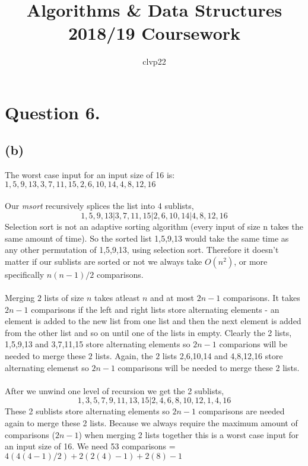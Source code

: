 \documentclass[]{article}
\title{Algorithms \& Data Structures 2018/19 Coursework}
\author{clvp22}
\begin{document}
\maketitle

\section*{Question 6.}
\subsection*{(b)}
The worst case input for an input size of 16 is: $1, 5, 9, 13, 3, 7, 11, 15, 2, 6, 10, 14, 4, 8, 12, 16$
\\
\\
Our \textit{msort} recursively splices the list into 4 sublists,
$$1, 5, 9, 13 | 3, 7, 11, 15 | 2, 6, 10, 14 | 4, 8, 12, 16$$
Selection sort is not an adaptive sorting algorithm (every input of size n takes the same amount of time).
So the sorted list 1,5,9,13 would take the same time as any other permutation of 1,5,9,13, using selection sort. Therefore it doesn't matter if our sublists are sorted or not we always take $O(n^2)$, or more specifically $n(n-1)/2$ comparisons.
\\
\\
Merging $2$ lists of size $n$ takes atleast $n$ and at most $2n-1$ comparisons. It takes $2n-1$ comparisons if the left and right lists store alternating elements - an element is added to the new list from one list and then the next element is added from the other list and so on until one of the lists in empty. Clearly the 2 lists, 1,5,9,13 and 3,7,11,15 store alternating elements so $2n-1$ comparions will be needed to merge these $2$ lists. Again, the $2$ lists 2,6,10,14 and 4,8,12,16 store alternating elemenst so $2n-1$ comparisons will be needed to merge these 2 lists.
\\
\\
After we unwind one level of recursion we get the 2 sublists,
$$1, 3, 5, 7, 9, 11, 13, 15 | 2, 4, 6, 8, 10, 12, 1, 4, 16$$
These 2 sublists store alternating elements so $2n-1$ comparisons are needed again to merge these 2 lists. Because we always require the maximum amount of comparisons ($2n-1$) when merging 2 lists together this is a worst case input for an input size of 16. We need 53 comparisons = $4(4(4-1)/2) + 2(2(4)-1) + 2(8)-1$
\end{document}
